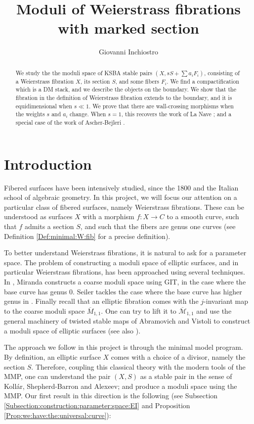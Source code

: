 \documentclass[11pt]{amsart}
\theoremstyle{definition}
\begin{document}
\title{Moduli of Weierstrass fibrations with marked section}
\author{Giovanni Inchiostro}
\begin{abstract} We study the the moduli space of KSBA stable pairs $(X,sS+\sum a_i F_i)$, consisting of a Weierstrass fibration $X$, its section $S$, and some fibers $F_i$. We find a compactification which is a DM stack, and we describe the objects on the boundary. We show that the fibration in the definition of Weierstrass fibration extends to the boundary, and it is equidimensional when $s \ll 1$. We prove that there are wall-crossing morphisms when the weights $s$ and $a_i$ change. When $s=1$, this recovers the work of La Nave \cite{LaNave}; and a special case of the work of Ascher-Bejleri \cite{AB3}. 
\end{abstract}
\maketitle 

\section{Introduction}
Fibered surfaces have been intensively studied,
since the 1800 and the Italian school of algebraic geometry.
In this project, we will focus our attention on a particular class of fibered surfaces, namely Weierstrass fibrations.
These can be understood as surfaces $X$ with a morphism $f:X \to C$ to a smooth curve, such that $f$ admits a section $S$, and such that the fibers are genus one curves (see Definition \ref{Def:minimal:W:fib} for a precise definition).

To better understand Weierstrass fibrations, it is natural to ask for a parameter space.
The problem of constructing a moduli space of elliptic surfaces, and in particular Weierstrass fibrations, has been approached using several techniques. In \cite{miranda-moduli}, Miranda constructs a coarse moduli space using GIT, in the case where the base curve has genus 0. Seiler tackles the case where the base curve has higher genus in \cite{moulielliptic}. Finally recall that an elliptic fibration comes with the $j$-invariant map to the coarse moduli space $\overline{M}_{1,1}$. One can try to lift it to $\overline{\mathcal{M}}_{1,1}$ and use the general machinery of twisted stable maps of Abramovich and Vistoli \cite{AV1} to construct a moduli space of elliptic surfaces (see also \cite{AB2}).


The approach we follow in this project is through the minimal model program. By definition, an elliptic surface $X$ comes with a choice of a divisor, namely the section $S$. Therefore, coupling this classical
theory with the modern tools of the MMP, one can understand
the pair $(X,S)$ as a stable pair in the sense of Koll\'ar, Shepherd-Barron and Alexeev; and produce a moduli space using the MMP. Our first result in this direction is the following (see Subsection \ref{Subsection:construction:parameter:space:EI} and Proposition \ref{Prop:we:have:the:universal:curve}): 
\end{document}
